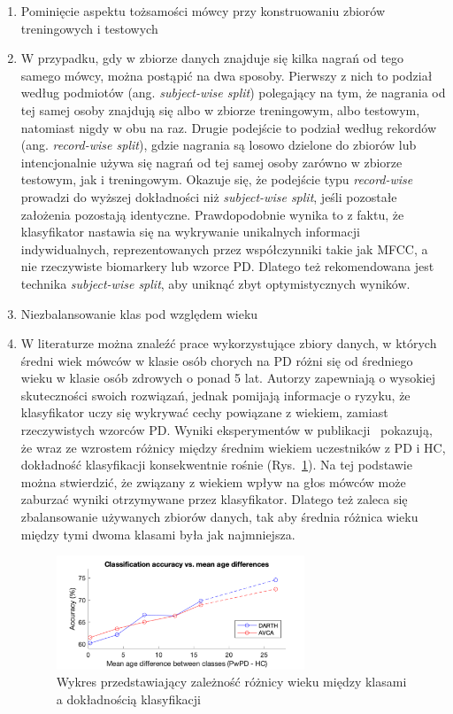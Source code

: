 \begin{enumerate}[label={\alph*)}]
	\item Pominięcie aspektu tożsamości mówcy przy konstruowaniu zbiorów treningowych i testowych
	\item[] W przypadku, gdy w zbiorze danych znajduje się kilka nagrań od tego samego mówcy, można postąpić na dwa sposoby.
Pierwszy z nich to podział według podmiotów (ang. \emph{subject-wise split}) polegający na tym, że nagrania od tej samej
osoby znajdują się albo w zbiorze treningowym, albo testowym, natomiast nigdy w obu na raz.
Drugie podejście to podział według rekordów (ang. \emph{record-wise split}), gdzie nagrania są losowo dzielone do zbiorów
lub intencjonalnie używa się nagrań od tej samej osoby zarówno w zbiorze testowym, jak i treningowym.
Okazuje się, że podejście typu \emph{record-wise} prowadzi do wyższej dokładności niż \emph{subject-wise split}, jeśli pozostałe założenia pozostają identyczne.
Prawdopodobnie wynika to z faktu, że klasyfikator nastawia się na wykrywanie unikalnych informacji indywidualnych,
reprezentowanych przez współczynniki takie jak MFCC, a nie rzeczywiste biomarkery lub wzorce PD\@.
Dlatego też rekomendowana jest technika \emph{subject-wise split}, aby uniknąć zbyt optymistycznych wyników.

  	\item Niezbalansowanie klas pod względem wieku
	\item[] W literaturze można znaleźć prace wykorzystujące zbiory danych, w których średni wiek mówców
w klasie osób chorych na PD różni się od średniego wieku w klasie osób zdrowych o ponad 5 lat.
Autorzy zapewniają o wysokiej skuteczności swoich rozwiązań, jednak pomijają informacje o ryzyku, że klasyfikator
uczy się wykrywać cechy powiązane z wiekiem, zamiast rzeczywistych wzorców PD\@.
Wyniki eksperymentów w publikacji~\cite{SustainedVowelsProblems} pokazują, że wraz ze wzrostem różnicy między średnim wiekiem uczestników z PD i HC,
dokładność klasyfikacji konsekwentnie rośnie (Rys.~\ref{fig:acc_and_age_diff}).
Na tej podstawie można stwierdzić, że związany z wiekiem wpływ na głos mówców może zaburzać wyniki otrzymywane przez klasyfikator.
Dlatego też zaleca się zbalansowanie używanych zbiorów danych, tak aby średnia różnica wieku między tymi dwoma klasami była jak najmniejsza.


\begin{figure}[htbp]
	\centering
	\includegraphics[width=0.7\textwidth]{./img/acc_and_age_difference}
	\caption{Wykres przedstawiający zależność różnicy wieku między klasami a dokładnością klasyfikacji~\cite{SustainedVowelsProblems}}
    \label{fig:acc_and_age_diff}
\end{figure}


\end{enumerate}
